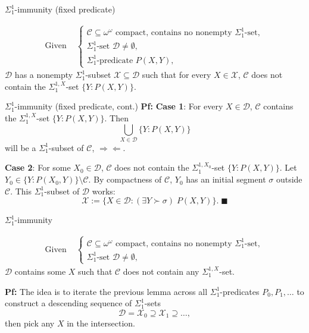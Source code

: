 \begin{frame}{$\Sigma_1^{1}$-immunity (fixed predicate)}
  \begin{lemma*}
    \begin{align*}
      \text{Given } &\begin{cases}
        \mathcal{C}\subseteq\omega^\omega \text{ compact, contains
        no nonempty } \Sigma_1^{1}\text{-set},\\
        \Sigma_1^{1}\text{-set } \mathcal{D}\neq\emptyset,\\
        \Sigma_1^{1}\text{-predicate } P(X,Y),
      \end{cases}
    \end{align*}
    $\mathcal{D}$ has a nonempty $\Sigma_1^{1}$-subset
    $\mathcal{X}\subseteq\mathcal{D}$ such that for every
    $X\in\mathcal{X}$, $\mathcal{C}$ does not contain the
    $\Sigma_1^{1,X}$-set $\{Y:P(X,Y)\}$.
  \end{lemma*}
\end{frame}

\begin{frame}{$\Sigma_1^{1}$-immunity (fixed predicate, cont.)}
  \textbf{Pf:} \textbf{Case 1}: For every $X\in\mathcal{D}$, $\mathcal{C}$
  contains the $\Sigma_1^{1,X}$-set $\{Y:P(X,Y)\}$. Then
  \[\bigcup_{X\in\mathcal{D}} \{Y:P(X,Y)\}\]
  will be a $\Sigma_1^{1}$-subset of $\mathcal{C}$, $\Rightarrow\Leftarrow$.

  \vspace{2em}
  \textbf{Case 2}: For some $X_0\in\mathcal{D}$, $\mathcal{C}$ does not
  contain the $\Sigma_1^{1,X_0}$-set $\{Y:P(X,Y)\}$. Let $Y_0 \in
  \{Y:P(X_0,Y)\} \setminus\mathcal{C}$. By compactness of $\mathcal{C}$,
  $Y_0$ has an initial segment $\sigma$ outside $\mathcal{C}$. This
  $\Sigma_1^{1}$-subset of $\mathcal{D}$ works: \[\mathcal{X}:=
  \{X\in\mathcal{D}: (\exists Y\succ\sigma)\; P(X,Y)\}.\; \blacksquare\]
\end{frame}

\begin{frame}{$\Sigma_1^{1}$-immunity}
  \begin{thm*}
    \begin{align*}
      \text{Given } &\begin{cases}
        \mathcal{C}\subseteq\omega^\omega \text{ compact, contains
        no nonempty } \Sigma_1^{1}\text{-set},\\
        \Sigma_1^{1}\text{-set } \mathcal{D}\neq\emptyset,
      \end{cases}
    \end{align*}
    $\mathcal{D}$ contains some $X$ such that $\mathcal{C}$ does not
    contain any $\Sigma_1^{1,X}$-set.
  \end{thm*}

  \vspace{1em}
  \textbf{Pf:} The idea is to iterate the previous lemma across all
  $\Sigma^1_1$-predicates $P_0,P_1,\ldots$ to construct a descending
  sequence of $\Sigma^1_1$-sets
  \[\mathcal{D} =\mathcal{X}_0 \supseteq\mathcal{X}_1 \supseteq\ldots,\]
  then pick any $X$ in the intersection.
\end{frame}

